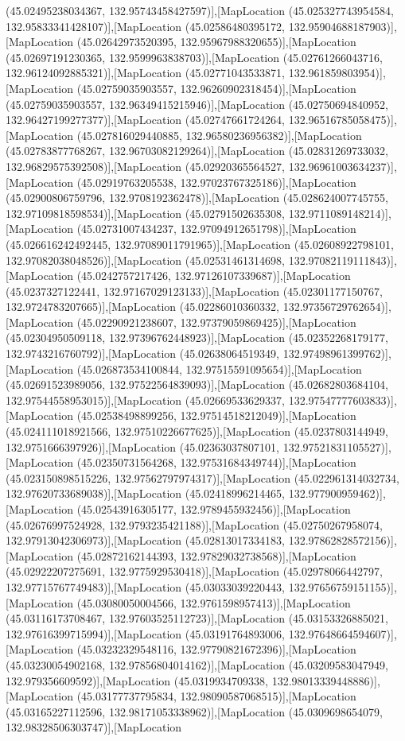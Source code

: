 (45.02495238034367, 132.95743458427597)],[MapLocation (45.025327743954584, 132.95833341428107)],[MapLocation (45.02586480395172, 132.95904688187903)],[MapLocation (45.02642973520395, 132.95967988320655)],[MapLocation (45.02697191230365, 132.9599963838703)],[MapLocation (45.02761266043716, 132.96124092885321)],[MapLocation (45.02771043533871, 132.961859803954)],[MapLocation (45.02759035903557, 132.96260902318454)],[MapLocation (45.02759035903557, 132.96349415215946)],[MapLocation (45.02750694840952, 132.96427199277377)],[MapLocation (45.02747661724264, 132.96516785058475)],[MapLocation (45.027816029440885, 132.96580236956382)],[MapLocation (45.02783877768267, 132.96703082129264)],[MapLocation (45.02831269733032, 132.96829575392508)],[MapLocation (45.02920365564527, 132.96961003634237)],[MapLocation (45.02919763205538, 132.97023767325186)],[MapLocation (45.02900806759796, 132.9708192362478)],[MapLocation (45.028624007745755, 132.97109818598534)],[MapLocation (45.02791502635308, 132.9711089148214)],[MapLocation (45.02731007434237, 132.97094912651798)],[MapLocation (45.026616242492445, 132.97089011791965)],[MapLocation (45.02608922798101, 132.97082038048526)],[MapLocation (45.02531461314698, 132.97082119111843)],[MapLocation (45.0242757217426, 132.97126107339687)],[MapLocation (45.0237327122441, 132.97167029123133)],[MapLocation (45.02301177150767, 132.9724783207665)],[MapLocation (45.02286010360332, 132.97356729762654)],[MapLocation (45.02290921238607, 132.97379059869425)],[MapLocation (45.02304950509118, 132.97396762448923)],[MapLocation (45.02352268179177, 132.9743216760792)],[MapLocation (45.02638064519349, 132.97498961399762)],[MapLocation (45.026873534100844, 132.97515591095654)],[MapLocation (45.02691523989056, 132.97522564839093)],[MapLocation (45.02682803684104, 132.97544558953015)],[MapLocation (45.02669533629337, 132.97547777603833)],[MapLocation (45.02538498899256, 132.97514518212049)],[MapLocation (45.024111018921566, 132.97510226677625)],[MapLocation (45.0237803144949, 132.9751666397926)],[MapLocation (45.02363037807101, 132.97521831105527)],[MapLocation (45.02350731564268, 132.97531684349744)],[MapLocation (45.023150898515226, 132.97562797974317)],[MapLocation (45.022961314032734, 132.97620733689038)],[MapLocation (45.02418996214465, 132.977900959462)],[MapLocation (45.02543916305177, 132.9789455932456)],[MapLocation (45.02676997524928, 132.9793235421188)],[MapLocation (45.02750267958074, 132.97913042306973)],[MapLocation (45.02813017334183, 132.97862828572156)],[MapLocation (45.02872162144393, 132.97829032738568)],[MapLocation (45.02922207275691, 132.9775929530418)],[MapLocation (45.02978066442797, 132.97715767749483)],[MapLocation (45.03033039220443, 132.97656759151155)],[MapLocation (45.03080050004566, 132.9761598957413)],[MapLocation (45.03116173708467, 132.97603525112723)],[MapLocation (45.03153326885021, 132.97616399715994)],[MapLocation (45.03191764893006, 132.97648664594607)],[MapLocation (45.03232329548116, 132.97790821672396)],[MapLocation (45.03230054902168, 132.97856804014162)],[MapLocation (45.03209583047949, 132.979356609592)],[MapLocation (45.0319934709338, 132.98013339448886)],[MapLocation (45.03177737795834, 132.98090587068515)],[MapLocation (45.03165227112596, 132.98171053338962)],[MapLocation (45.0309698654079, 132.98328506303747)],[MapLocation 